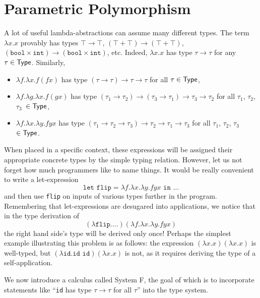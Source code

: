 \chapter{Parametric Polymorphism}
A lot of useful lambda-abstractions can assume many different types.
The term $\lambda x . x$ provably has types $\top \rightarrow \top$, 
$(\top + \top) \rightarrow (\top + \top)$, $(\texttt{bool} \times \texttt{int}) \rightarrow (\texttt{bool} \times \texttt{int})$,
etc. Indeed, $\lambda x. x$ has type $\tau \rightarrow \tau$ for any $\tau \in \mathsf{Type}$.
Similarly,
\begin{itemize}
\item $\lambda f. \lambda x. f (f x)$ has type $(\tau \rightarrow \tau) \rightarrow \tau \rightarrow \tau$ for all $\tau \in \mathsf{Type}$,
\item $\lambda f. \lambda g. \lambda x. f (g x)$ has type 
$(\tau_1 \rightarrow \tau_2) \rightarrow (\tau_3 \rightarrow \tau_1) \rightarrow \tau_3 \rightarrow \tau_2$ 
for all $\tau_1$, $\tau_2$, $\tau_3$~$\in \mathsf{Type}$,
\item $\lambda f. \lambda x. \lambda y. f y x$ has type 
$(\tau_1 \rightarrow \tau_2 \rightarrow \tau_3) \rightarrow \tau_2 \rightarrow \tau_1 \rightarrow \tau_3$ 
for all $\tau_1$, $\tau_2$, $\tau_3$~$\in \mathsf{Type}$.
\end{itemize}
When placed in a specific context, these expressions will be assigned their
appropriate concrete types by the simple typing relation. However, let us not
forget how much programmers like to name things. It would be really convenient
to write a let-expression
\[ \texttt{let flip} = \lambda f. \lambda x. \lambda y. f y x \texttt{ in } \ldots \]
and then use \texttt{flip} on inputs of various types further in the program. 
Remembering that let-expressions are desugared into applications, we notice that 
in the type derivation of
\[ (\lambda \texttt{flip}. \ldots) (\lambda f. \lambda x. \lambda y. f y x) \]
the right hand side's type will be derived only once! Perhaps the simplest
example illustrating this problem is as follows: the expression $(\lambda x . x)(\lambda x . x)$
is well-typed, but $(\lambda \texttt{id}. \texttt{id id}) (\lambda x . x)$ is not,
as it requires deriving the type of a self-application.

We now introduce a calculus called System F, the goal of which is to incorporate
statements like ``\texttt{id} has type $\tau \rightarrow \tau$ for all $\tau$'' 
into the type system.
